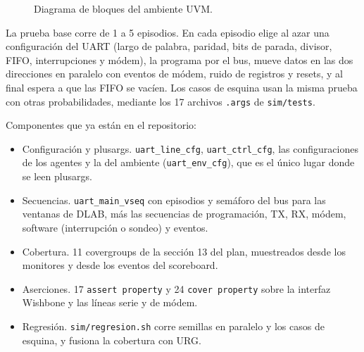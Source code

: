 \documentclass[11pt,letterpaper]{article}
\newcommand{\cod}[1]{\texttt{#1}}
\begin{document}
\begin{figure}[h]
\caption{Diagrama de bloques del ambiente UVM.}\label{fig:arq}
\end{figure}

La prueba base corre de 1 a 5 episodios. En cada episodio elige al azar una configuración del UART (largo de palabra, paridad, bits de parada, divisor, FIFO, interrupciones y módem), la programa por el bus, mueve datos en las dos direcciones en paralelo con eventos de módem, ruido de registros y resets, y al final espera a que las FIFO se vacíen. Los casos de esquina usan la misma prueba con otras probabilidades, mediante los 17 archivos \cod{.args} de \cod{sim/tests}.

Componentes que ya están en el repositorio:
\begin{itemize}
\item Configuración y plusargs. \cod{uart\_line\_cfg}, \cod{uart\_ctrl\_cfg}, las configuraciones de los agentes y la del ambiente (\cod{uart\_env\_cfg}), que es el único lugar donde se leen plusargs.
\item Secuencias. \cod{uart\_main\_vseq} con episodios y semáforo del bus para las ventanas de DLAB, más las secuencias de programación, TX, RX, módem, software (interrupción o sondeo) y eventos.
\item Cobertura. 11 covergroups de la sección 13 del plan, muestreados desde los monitores y desde los eventos del scoreboard.
\item Aserciones. 17 \cod{assert property} y 24 \cod{cover property} sobre la interfaz Wishbone y las líneas serie y de módem.
\item Regresión. \cod{sim/regresion.sh} corre semillas en paralelo y los casos de esquina, y fusiona la cobertura con URG.
\end{itemize}
\end{document}
